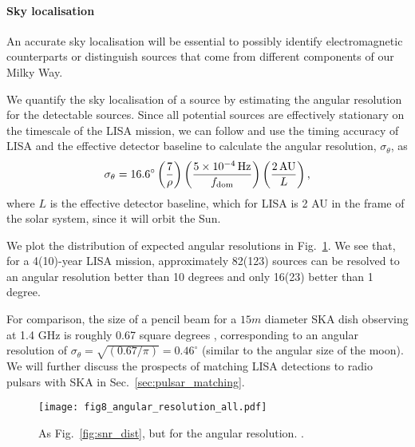 \paragraph{Sky localisation}

An accurate sky localisation will be essential to possibly identify electromagnetic counterparts or distinguish sources that come from different components of our Milky Way. 

We quantify the sky localisation of a source by estimating the angular resolution for the detectable sources. Since all potential sources are effectively stationary on the timescale of the LISA mission, we can follow \citet{Mandel+2018} and use the timing accuracy of LISA and the effective detector baseline to calculate the angular resolution, $\sigma_{\theta}$, as
\begin{equation}
    \sigma_{\theta} = 16.6^\circ \left(\frac{7}{\rho}\right) \left(\frac{5 \times 10^{-4} \unit{Hz}}{f_{\rm dom}}\right) \left( \frac{2 \unit{AU}}{L} \right),
\end{equation}
where $L$ is the effective detector baseline, which for LISA is 2 AU in the frame of the solar system, since it will orbit the Sun.

We plot the distribution of expected angular resolutions in Fig.~\ref{fig:ang_res}. We see that, for a 4(10)-year LISA mission, approximately 82(123) sources can be resolved to an angular resolution better than 10 degrees and only 16(23) better than 1 degree. 

For comparison, the size of a pencil beam for a $15 \unit{m}$ diameter SKA dish observing at 1.4 GHz is roughly 0.67 square degrees \citep{Smits+2009}, corresponding to an angular resolution of $\sigma_\theta = \sqrt{(0.67 / \pi)} = 0.46^\circ$ (similar to the angular size of the moon). We will further discuss the prospects of matching LISA detections to radio pulsars with SKA in Sec.~\ref{sec:pulsar_matching}.

\begin{figure}[htb]
    \centering
    \texttt{[image: fig8\_angular\_resolution\_all.pdf]}
    \caption{As Fig.~\ref{fig:snr_dist}, but for the angular resolution. \href{https://github.com/TomWagg/detecting-DCOs-in-LISA/blob/main/paper/figures/fig8_angular_resolution_all.pdf}{\faFileImage} \href{https://github.com/TomWagg/detecting-DCOs-in-LISA/blob/main/paper/figure_notebooks/fiducial.ipynb}{\faBook}.}
    \label{fig:ang_res}
\end{figure}
